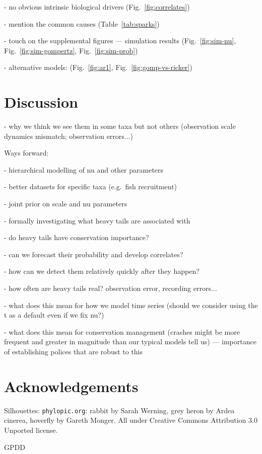 \documentclass[11pt]{article}
\begin{document}
- no obvious intrinsic biological drivers (Fig.~\ref{fig:correlates})

- mention the common causes (Table~\ref{tab:sparks})

- touch on the supplemental figures --- simulation results (Fig.~\ref{fig:sim-nu}, Fig.~\ref{fig:sim-gompertz}, Fig.~\ref{fig:sim-prob})

- alternative models: (Fig.~\ref{fig:ar1}, Fig.~\ref{fig:gomp-vs-ricker})

\section{Discussion}

- why we think we see them in some taxa but not others (observation scale dynamics mismatch; observation errors...)

Ways forward:

- hierarchical modelling of nu and other parameters

- better datasets for specific taxa (e.g.\ fish recruitment)

- joint prior on scale and nu parameters

- formally investigating what heavy tails are associated with

- do heavy tails have conservation importance?

- can we forecast their probability and develop correlates?

- how can we detect them relatively quickly after they happen?

- how often are heavy tails real? observation error, recording errors...

- what does this mean for how we model time series (should we consider using the t as a default even if we fix nu?)

- what does this mean for conservation management (crashes might be more frequent and greater in magnitude than our typical models tell us) --- importance of establishing polices that are robust to this

\section{Acknowledgements}

Silhouettes: \texttt{phylopic.org}: rabbit by Sarah Werning, grey heron by Ardea cinerea, hoverfly by Gareth Monger. All under Creative Commons Attribution 3.0 Unported license.

GPDD
\end{document}
